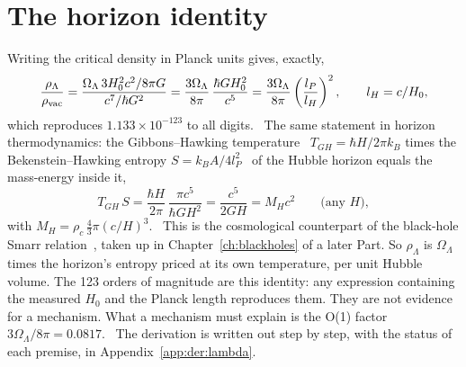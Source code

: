 \section{The horizon identity}\label{sec:lam_ident}
Writing the critical density in Planck units gives, exactly,
\begin{equation}\frac{\rho_\Lambda}{\rho_{\rm vac}}=\frac{\Omega_\Lambda\,3H_0^2c^2/8\pi G}{c^7/\hbar G^2}
=\frac{3\Omega_\Lambda}{8\pi}\,\frac{\hbar GH_0^2}{c^5}=\frac{3\Omega_\Lambda}{8\pi}\left(\frac{l_P}{l_H}\right)^2,\qquad l_H=c/H_0,\label{eq:ident}\end{equation}
which reproduces $1.133\times10^{-123}$ to all digits. \derived\ The same statement in horizon thermodynamics: the Gibbons--Hawking
temperature~\cite{GibbonsHawking1977} $T_{GH}=\hbar H/2\pi k_B$ times the Bekenstein--Hawking entropy
$S=k_BA/4l_P^2$~\cite{Bekenstein1973,Hawking1975} of the Hubble horizon equals the mass-energy inside it,
\begin{equation}T_{GH}\,S=\frac{\hbar H}{2\pi}\,\frac{\pi c^5}{\hbar GH^2}=\frac{c^5}{2GH}=M_Hc^2\qquad\text{(any }H),\label{eq:lam_smarr}\end{equation}
with $M_H=\rho_c\,\tfrac43\pi(c/H)^3$. \derived\ This is the cosmological counterpart of the black-hole Smarr relation~\cite{Smarr1973},
taken up in Chapter~\ref{ch:blackholes} of a later Part. So $\rho_\Lambda$ is $\Omega_\Lambda$ times the horizon's entropy priced at its own
temperature, per unit Hubble volume. The 123 orders of magnitude are this identity: any expression containing the measured $H_0$ and
the Planck length reproduces them. They are not evidence for a mechanism. What a mechanism must explain is the O(1) factor
$3\Omega_\Lambda/8\pi=0.0817$. \calc\ The derivation is written out step by step, with the status of each premise, in
Appendix~\ref{app:der:lambda}.

